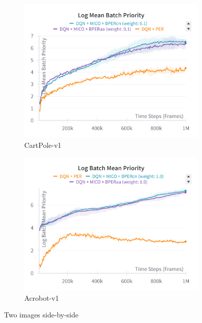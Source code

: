\begin{figure}[h]
    \hfill
    \begin{subfigure}{0.45\textwidth}
        \includegraphics[width=\linewidth]{Results/general_results/log_mean_batch_priority_cartpolev1.png}
        \caption{CartPole-v1}
        \label{fig:uniform_weighting}
    \end{subfigure}
    \hfill
    \begin{subfigure}{0.45\textwidth}
        \includegraphics[width=\linewidth]{Results/general_results/log_mean_batch_priority_acrobot.png}
        \caption{Acrobot-v1}
        \label{fig:uniform_weighting}
    \end{subfigure}
    \caption{Two images side-by-side}
    \label{fig:outdated_priorities}
\end{figure}
